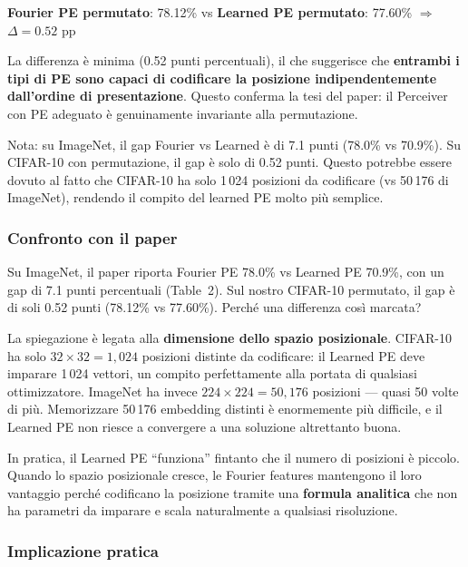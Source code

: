 \documentclass[12pt,a4paper]{article}
\begin{document}
\begin{examplebox}
\textbf{Fourier PE permutato}: 78.12\% \quad vs \quad \textbf{Learned PE permutato}: 77.60\% \quad $\Rightarrow$ \quad $\Delta = 0.52$ pp

La differenza \`e minima (0.52 punti percentuali), il che suggerisce che \textbf{entrambi i tipi di PE sono capaci di codificare la posizione indipendentemente dall'ordine di presentazione}. Questo conferma la tesi del paper: il Perceiver con PE adeguato \`e genuinamente invariante alla permutazione.

Nota: su ImageNet, il gap Fourier vs Learned \`e di 7.1 punti (78.0\% vs 70.9\%). Su CIFAR-10 con permutazione, il gap \`e solo di 0.52 punti. Questo potrebbe essere dovuto al fatto che CIFAR-10 ha solo 1\,024 posizioni da codificare (vs 50\,176 di ImageNet), rendendo il compito del learned PE molto pi\`u semplice.
\end{examplebox}

\subsubsection{Confronto con il paper}

Su ImageNet, il paper riporta Fourier PE 78.0\% vs Learned PE 70.9\%, con un gap di 7.1 punti percentuali (Table~2). Sul nostro CIFAR-10 permutato, il gap \`e di soli 0.52 punti (78.12\% vs 77.60\%). Perch\'e una differenza cos\`i marcata?

La spiegazione \`e legata alla \textbf{dimensione dello spazio posizionale}. CIFAR-10 ha solo $32 \times 32 = 1{,}024$ posizioni distinte da codificare: il Learned PE deve imparare 1\,024 vettori, un compito perfettamente alla portata di qualsiasi ottimizzatore. ImageNet ha invece $224 \times 224 = 50{,}176$ posizioni --- quasi 50 volte di pi\`u. Memorizzare 50\,176 embedding distinti \`e enormemente pi\`u difficile, e il Learned PE non riesce a convergere a una soluzione altrettanto buona.

In pratica, il Learned PE ``funziona'' fintanto che il numero di posizioni \`e piccolo. Quando lo spazio posizionale cresce, le Fourier features mantengono il loro vantaggio perch\'e codificano la posizione tramite una \textbf{formula analitica} che non ha parametri da imparare e scala naturalmente a qualsiasi risoluzione.

\subsubsection{Implicazione pratica}
\end{document}
